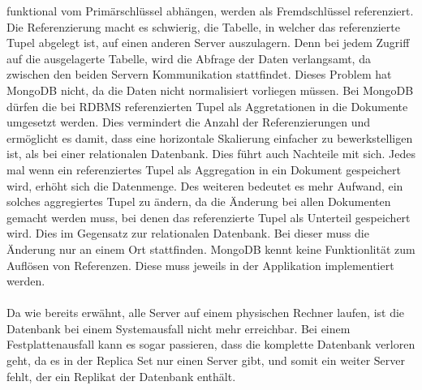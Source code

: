  funktional vom Primärschlüssel abhängen, werden als Fremdschlüssel
 referenziert. Die Referenzierung macht es schwierig, die Tabelle, in
 welcher das referenzierte Tupel abgelegt ist, auf einen anderen Server
 auszulagern. Denn bei jedem Zugriff auf die ausgelagerte Tabelle, wird die
 Abfrage der Daten verlangsamt, da zwischen den beiden Servern Kommunikation
 stattfindet. Dieses Problem hat MongoDB nicht, da die Daten nicht normalisiert
 vorliegen müssen. Bei MongoDB dürfen die bei RDBMS referenzierten Tupel als
 Aggretationen in die Dokumente umgesetzt werden. Dies vermindert die Anzahl der
 Referenzierungen und ermöglicht es damit, dass eine horizontale Skalierung
 einfacher zu bewerkstelligen ist, als bei einer relationalen Datenbank. Dies
 führt auch Nachteile mit sich. Jedes mal wenn ein referenziertes
 Tupel als Aggregation in ein Dokument gespeichert wird, erhöht sich die
 Datenmenge. Des weiteren bedeutet es mehr Aufwand, ein solches aggregiertes
 Tupel zu ändern, da die Änderung bei allen Dokumenten gemacht werden muss, bei denen
 das referenzierte Tupel als Unterteil gespeichert wird. Dies im Gegensatz zur
 relationalen Datenbank. Bei dieser muss die Änderung nur an einem Ort
 stattfinden. MongoDB kennt keine Funktionlität zum Auflösen von Referenzen.
 Diese muss jeweils in der Applikation implementiert werden. \\\\
 Da wie bereits erwähnt, alle Server auf einem physischen Rechner
 laufen, ist die Datenbank bei einem Systemausfall nicht mehr erreichbar.
Bei einem Festplattenausfall kann es sogar passieren, dass die komplette
Datenbank verloren geht, da es in der Replica Set nur einen Server gibt, und
somit ein weiter Server fehlt, der ein Replikat der Datenbank enthält.
 
